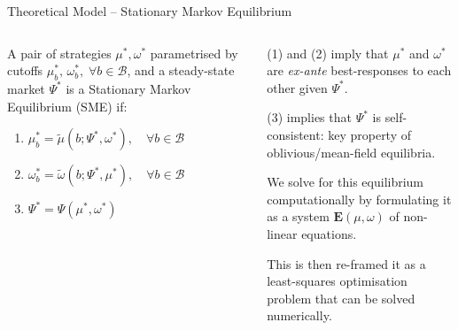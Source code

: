 \documentclass[10pt, aspectratio=169,xcolor=dvipsnames]{beamer}
\makeatletter
\newenvironment{myitemize}{%
   \setlength{\topsep}{0pt}
   \setlength{\partopsep}{0pt}
   \itemize
}{\enditemize}
\makeatother
\begin{document}
\begin{frame}{Theoretical Model – Stationary Markov Equilibrium}
\begin{columns}
\begin{column}{0.5\textwidth}  
    \begin{definition}
    \par\vspace{0.4cm} 
    A pair of strategies $\mu^*,\omega^*$ parametrised by cutoffs $\mu^*_b,\, \omega^*_b,\;\forall b \in \mathcal{B}$, and a steady-state market $\Psi^*$ is a Stationary Markov Equilibrium (SME) if:
    \par\vspace{0.4cm} 
    \begin{enumerate}
        \item $\mu^*_b=\widetilde \mu(b;\Psi^*,\omega^*),\quad\forall b\in\mathcal{B}$
        \item $\omega^*_b=\widetilde\omega(b;\Psi^* ,\mu^*),\quad\forall b\in\mathcal{B}$
        \item $\Psi^*= \Psi(\mu^*,\omega^*)$
    \par\vspace{0.4cm}     
\end{enumerate}
    \end{definition} 
\end{column}
\begin{column}{0.5\textwidth}
\begin{myitemize}    
\setlength\itemsep{1em} 
    \item (1) and (2) imply that $\mu^*$ and $\omega^*$ are \textit{ex-ante} best-responses to each other given $\Psi^*$.
    \item (3) implies that $\Psi^*$ is self-consistent: key property of oblivious/mean-field equilibria. 
    \item We solve for this equilibrium computationally by formulating it as a system $\mathbf{E}(\mu,\omega)$ of non-linear equations.
    \item This is then re-framed it as a least-squares optimisation problem that can be solved numerically.
\end{myitemize}
\end{column}
\end{columns}
\end{frame}

\end{document}
